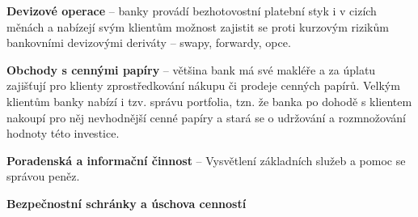 \textbf{Devizové operace} -- banky provádí bezhotovostní platební styk i v cizích měnách a nabízejí svým klientům možnost zajistit se proti kurzovým rizikům bankovními devizovými deriváty -- swapy, forwardy, opce.

\textbf{Obchody s cennými papíry} -- většina bank má své makléře a za úplatu zajišťují pro klienty zprostředkování nákupu či prodeje cenných papírů. Velkým klientům banky nabízí i tzv. správu portfolia, tzn. že banka po dohodě s klientem nakoupí pro něj nevhodnější cenné papíry a stará se o udržování a rozmnožování hodnoty této investice.

\textbf{Poradenská a informační činnost} -- Vysvětlení základních služeb a pomoc se správou peněz.

\textbf{Bezpečnostní schránky a úschova cenností}